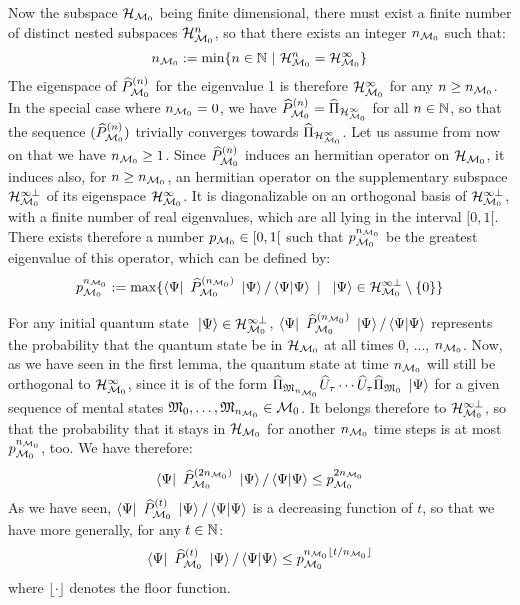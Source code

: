  Now the subspace $\mathcal H_{\mathcal M_0}$ being finite dimensional, there must exist a finite number of distinct nested subspaces $\mathcal H_{\mathcal M_0}^n$, so that there exists an integer $n_{\mathcal M_0}$ such that:
\begin{equation*}
n_{\mathcal M_0} := \min \{ n \in \mathbb{N}\ |\ \mathcal H_{\mathcal M_0}^n = \mathcal H_{\mathcal M_0}^\infty \}
\end{equation*}
The eigenspace of $\widehat{P}_{\mathcal M_0}^{(n)}$ for the eigenvalue 1 is therefore $\mathcal H_{\mathcal M_0}^\infty$ for any $n \geq n_{\mathcal M_0}$. In the special case where $n_{\mathcal M_0} = 0$, we have $\widehat{P}_{\mathcal M_0}^{(n)} = \widehat{\Pi}_{\mathcal H_{\mathcal M_0}^\infty}$ for all $n \in \mathbb{N}$, so that the sequence $(\widehat{P}_{\mathcal M_0}^{(n)})$ trivially converges towards $\widehat{\Pi}_{\mathcal H_{\mathcal M_0}^\infty}$. Let us assume from now on that we have $n_{\mathcal M_0} \geq 1$. Since $\widehat{P}_{\mathcal M_0}^{(n)}$ induces an hermitian operator on $\mathcal H_{\mathcal M_0}$, it induces also, for $n \geq n_{\mathcal M_0}$, an hermitian operator on the supplementary subspace $\mathcal H_{\mathcal M_0}^{\infty \perp}$ of its eigenspace $\mathcal H_{\mathcal M_0}^\infty$. It is diagonalizable on an orthogonal basis of $\mathcal H_{\mathcal M_0}^{\infty \perp}$, with a finite number of real eigenvalues, which are all lying in the interval $[0, 1[$. There exists therefore a number $p_{\mathcal M_0} \in [0, 1[$ such that $p_{\mathcal M_0}^{n_{\mathcal M_0}}$ be the greatest eigenvalue of this operator, which can be defined by:
\begin{equation*}
p_{\mathcal M_0}^{n_{\mathcal M_0}} := \max \{ \left\langle{\Psi}\right|\  \widehat{P}_{\mathcal M_0}^{(n_{\mathcal M_0})} \ \left|{\Psi}\right\rangle / \left\langle{\Psi}|{\Psi}\right\rangle \ |\ \ \left|{\Psi}\right\rangle \in \mathcal H_{\mathcal M_0}^{\infty \perp} \setminus \{ 0 \} \}
\end{equation*}

 For any initial quantum state $\ \left|{\Psi}\right\rangle \in \mathcal H_{\mathcal M_0}^{\infty \perp}$, $\left\langle{\Psi}\right|\  \widehat{P}_{\mathcal M_0}^{(n_{\mathcal M_0})} \ \left|{\Psi}\right\rangle / \left\langle{\Psi}|{\Psi}\right\rangle$ represents the probability that the quantum state be in $\mathcal H_{\mathcal M_0}$ at all times 0, ..., $n_{\mathcal M_0}$. Now, as we have seen in the first lemma, the quantum state at time $n_{\mathcal M_0}$ will still be orthogonal to $\mathcal H_{\mathcal M_0}^\infty$, since it is of the form $\widehat{\Pi}_{\mathfrak{M}_{n_{\mathcal M_0}}} \widehat{U}_\tau \dotsm \widehat{U}_\tau \widehat{\Pi}_{\mathfrak{M}_0} \ \left|{\Psi}\right\rangle$ for a given sequence of mental states $\mathfrak{M}_0, \dotsc, \mathfrak{M}_{n_{\mathcal M_0}} \in \mathcal M_0$. It belongs therefore to $\mathcal H_{\mathcal M_0}^{\infty \perp}$, so that the probability that it stays in $\mathcal H_{\mathcal M_0}$ for another $n_{\mathcal M_0}$ time steps is at most $p_{\mathcal M_0}^{n_{\mathcal M_0}}$, too. We have therefore:
\begin{equation*}
\left\langle{\Psi}\right|\  \widehat{P}_{\mathcal M_0}^{(2 n_{\mathcal M_0})} \ \left|{\Psi}\right\rangle / \left\langle{\Psi}|{\Psi}\right\rangle \leq p_{\mathcal M_0}^{2 n_{\mathcal M_0}}
\end{equation*}
As we have seen, $\left\langle{\Psi}\right|\  \widehat{P}_{\mathcal M_0}^{(t)} \ \left|{\Psi}\right\rangle / \left\langle{\Psi}|{\Psi}\right\rangle$ is a decreasing function of $t$, so that we have more generally, for any $t \in \mathbb{N}$:
\begin{equation*}
\left\langle{\Psi}\right|\  \widehat{P}_{\mathcal M_0}^{(t)} \ \left|{\Psi}\right\rangle / \left\langle{\Psi}|{\Psi}\right\rangle \leq p_{\mathcal M_0}^{n_{\mathcal M_0} \lfloor t / n_{\mathcal M_0} \rfloor}
\end{equation*}
where $\lfloor \cdot \rfloor$ denotes the floor function. 

